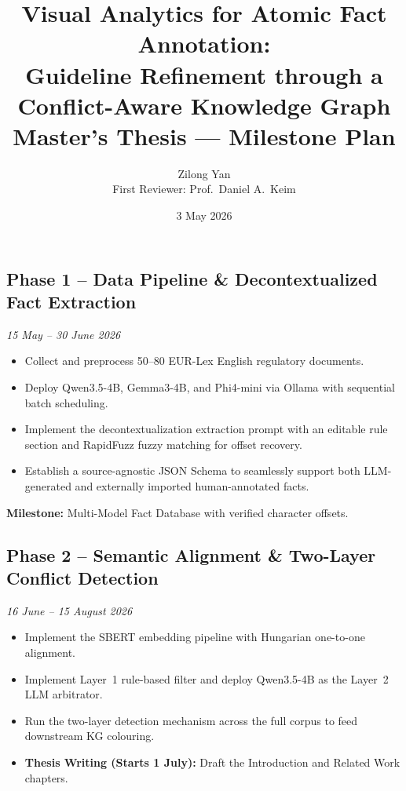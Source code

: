 \documentclass[11pt]{article}
\title{\textbf{Visual Analytics for Atomic Fact Annotation:\\
Guideline Refinement through a Conflict-Aware Knowledge Graph}\\[0.4em]
\large Master's Thesis --- Milestone Plan}
\author{Zilong Yan \\[0.2em]
\quad First Reviewer: Prof.\ Daniel A.\ Keim}
\date{3 May 2026}
\begin{document}
\maketitle

\subsection*{Phase 1 -- Data Pipeline \& Decontextualized Fact Extraction}
\textit{15 May -- 30 June 2026}

\begin{itemize}[leftmargin=1.5em, itemsep=2pt]
    \item Collect and preprocess 50--80 EUR-Lex English regulatory documents.
    \item Deploy Qwen3.5-4B, Gemma3-4B, and Phi4-mini via Ollama with sequential batch scheduling.
    \item Implement the decontextualization extraction prompt with an editable rule section and RapidFuzz fuzzy matching for offset recovery.
    \item Establish a source-agnostic JSON Schema to seamlessly support both LLM-generated and externally imported human-annotated facts.
\end{itemize}

\textbf{Milestone:} Multi-Model Fact Database with verified character offsets.

\subsection*{Phase 2 -- Semantic Alignment \& Two-Layer Conflict Detection}
\textit{16 June -- 15 August 2026}

\begin{itemize}[leftmargin=1.5em, itemsep=2pt]
    \item Implement the SBERT embedding pipeline with Hungarian one-to-one alignment.
    \item Implement Layer~1 rule-based filter and deploy Qwen3.5-4B as the Layer~2 LLM arbitrator.
    \item Run the two-layer detection mechanism across the full corpus to feed downstream KG colouring.
    \item \textbf{Thesis Writing (Starts 1 July):} Draft the Introduction and Related Work chapters.
\end{itemize}
\end{document}
